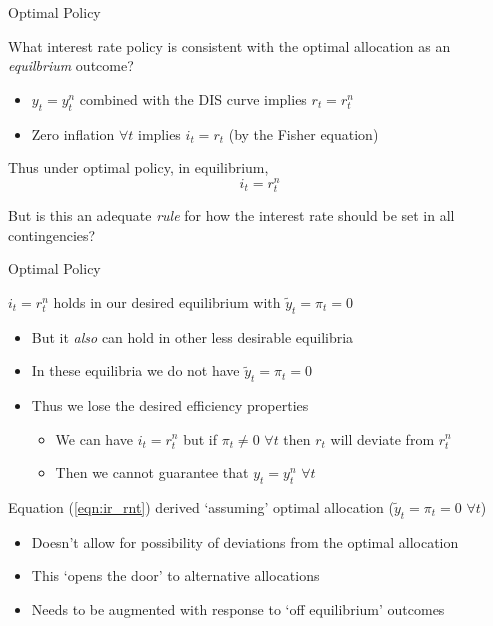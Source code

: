 \begin{frame}{Optimal Policy}

What interest rate policy is consistent with the optimal allocation as an \emph{equilbrium} outcome?
\begin{itemize}
\item	$y_{t}=y^{n}_{t}$ combined with the DIS curve implies $r_{t} = r^{n}_{t}$
\item	Zero inflation $\forall t$ implies $i_{t} =  r_{t}$ (by the Fisher equation)
\end{itemize}

\vspace{2mm}
Thus under optimal policy, in equilibrium,
\begin{equation}
i_{t} = r^{n}_{t}	\label{eqn:ir_rnt}
\end{equation}

\vspace{2mm}
But is this an adequate \emph{rule} for how the interest rate should be set in all contingencies?

\end{frame}


	
\begin{frame}{Optimal Policy}

$i_{t}=r^{n}_{t}$ holds in our desired equilibrium with $\tilde{y}_{t}=\pi_{t}=0$
\begin{itemize}
\item	But it \emph{also} can hold in other less desirable equilibria
\item	In these equilibria we do not have $\tilde{y}_{t}=\pi_{t}=0$
\item	Thus we lose the desired efficiency properties
	\begin{itemize}
	\item	We can have $i_{t}=r^{n}_{t}$ but if $\pi_{t}\neq0$ $\forall t$ then $r_{t}$ will deviate from $r^{n}_{t}$
	\item	Then we cannot guarantee that $y_{t}=y^{n}_{t}$ $\forall t$
	\end{itemize}
\end{itemize}

\vspace{2mm}
Equation (\ref{eqn:ir_rnt}) derived `assuming' optimal allocation ($\tilde{y}_{t}=\pi_{t}=0$ $\forall t$)
\begin{itemize}
\item	Doesn't allow for possibility of deviations from the optimal allocation
\item	This `opens the door' to alternative allocations
\item	Needs to be augmented with response to `off equilibrium' outcomes
\end{itemize}

\end{frame}

